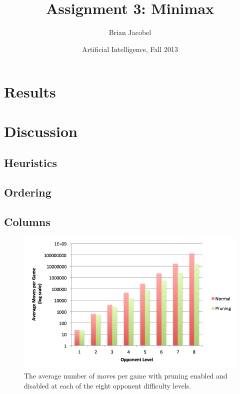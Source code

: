 \documentclass{article}
\title{Assignment 3: Minimax}
\author{Brian Jacobel}
\date{Artificial Intelligence, Fall 2013}
\begin{document}
\maketitle

\begin{doublespace}

\section{Results}

\section{Discussion}

\subsection{Heuristics}

 
\subsection{Ordering}



\subsection{Columns}

\begin{figure}[ht!]
\centering
\includegraphics[width=6.5in]{../Data/Graphs/Graph2}
\caption{The average number of moves per game with pruning enabled and disabled at each of the eight opponent difficulty levels.}
\end{figure}


\end{doublespace}
\end{document}
